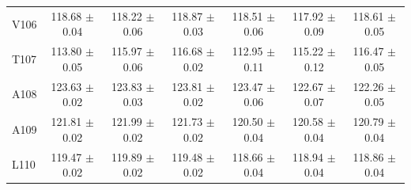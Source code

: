 \documentclass[%
 aip,
 amsmath,amssymb,
 preprint,%
]{revtex4-1}
\begin{document}
\begin{center}
\begin{longtable}{l|c|c|c|c|c|c}
V106 & 118.68 $\pm$ 0.04 & 118.22 $\pm$ 0.06 & 118.87 $\pm$ 0.03 & 118.51 $\pm$ 0.06 & 117.92 $\pm$ 0.09 & 118.61 $\pm$ 0.05 \\
T107 & 113.80 $\pm$ 0.05 & 115.97 $\pm$ 0.06 & 116.68 $\pm$ 0.02 & 112.95 $\pm$ 0.11 & 115.22 $\pm$ 0.12 & 116.47 $\pm$ 0.05 \\
A108 & 123.63 $\pm$ 0.02 & 123.83 $\pm$ 0.03 & 123.81 $\pm$ 0.02 & 123.47 $\pm$ 0.06 & 122.67 $\pm$ 0.07 & 122.26 $\pm$ 0.05 \\
A109 & 121.81 $\pm$ 0.02 & 121.99 $\pm$ 0.02 & 121.73 $\pm$ 0.02 & 120.50 $\pm$ 0.04 & 120.58 $\pm$ 0.04 & 120.79 $\pm$ 0.04 \\
L110 & 119.47 $\pm$ 0.02 & 119.89 $\pm$ 0.02 & 119.48 $\pm$ 0.02 & 118.66 $\pm$ 0.04 & 118.94 $\pm$ 0.04 & 118.86 $\pm$ 0.04 \\
\end{longtable}
\end{center}
\endgroup
\end{document}
